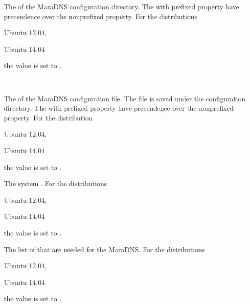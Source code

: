 The  of the MaraDNS configuration directory.
The with  prefixed property have precendence over the 
nonprefixed property.
For the distributions
\begin{inparaitem}
\item[\TheDistribution{ubuntu}] Ubuntu 12.04,
\item[\TheDistribution{ubuntu}] Ubuntu 14.04
\end{inparaitem}
the value is set to .

\\

The  of the MaraDNS configuration file. The file is saved
under the configuration directory.
The with  prefixed property have precendence over the 
nonprefixed property.
For the distribution
\begin{inparaitem}
\item[\TheDistribution{ubuntu}] Ubuntu 12.04,
\item[\TheDistribution{ubuntu}] Ubuntu 14.04
\end{inparaitem}
the value is set to .


The system . 
For the distributions
\begin{inparaitem}
\item[\TheDistribution{ubuntu}] Ubuntu 12.04,
\item[\TheDistribution{ubuntu}] Ubuntu 14.04
\end{inparaitem}
the value is set to .


The list of  that are needed for the MaraDNS.
For the distributions
\begin{inparaitem}
\item[\TheDistribution{ubuntu}] Ubuntu 12.04,
\item[\TheDistribution{ubuntu}] Ubuntu 14.04
\end{inparaitem}
the value is set to .

